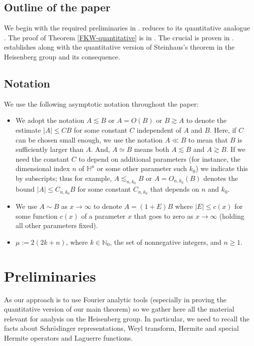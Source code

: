 \documentclass[11pt, reqno]{amsart}
\theoremstyle{plain}
\theoremstyle{remark}
\theoremstyle{example}
\theoremstyle{definition}
\numberwithin{equation}{section}
\newcommand{\N}{\mathbb N}
\def\Ha{\mathbb{H}^n}
\begin{document}
\subsection{Outline of the paper} We begin with the required preliminaries in .  reduces  to its quantitative analogue . The proof of Theorem \ref{FKW-quantitative} is in . The crucial  is proven in .  establishes  along with the quantitative version of Steinhaus's theorem in the Heisenberg group and its consequence.
\subsection{Notation}\label{notation-sec} We use the following asymptotic notation throughout the paper:
\begin{itemize}
    \item  We adopt the notation  $A\lesssim B$ or $A=O(B)$ or $ B \gtrsim A$ to denote the estimate $|A| \leq C B$ for some constant $C$ independent of $A$ and $B$. Here, if $C$ can be chosen small enough, we use the notation $A \ll B$ to mean that $B$ is sufficiently larger than $A$. And, $A \simeq B $ means both $A\lesssim B$ and $ A \gtrsim B$. If we need the constant $C$ to depend on additional parameters (for instance, the dimensional index $n$ of $\Ha$ or some other parameter such $k_{0}$)  we indicate this by subscripts; thus for example, $A \lesssim_{n,k_{0}} B$ or $A =O_{n,k_{0}}( B )$ denotes the bound $|A| \leq C_{n,k_{0}} B$ for some constant $C_{n,k_{0}}$ that depends on $n$ and $k_{0}$.
    \item We use $A \sim B$ as $x \rightarrow \infty$ to denote $A = (1 + E) B$ where $|E| \leq c(x)$ for some function $c(x)$ of a parameter $x$ that goes to zero as {$x \rightarrow \infty$} (holding all other parameters fixed).
    \item $\mu:= 2(2k+n)$, where $k \in \N_{0}$, the set of nonnegative integers, and $n \geq 1$.
\end{itemize}

\section{Preliminaries}\label{Preliminaries}
As our approach is to use Fourier analytic tools (especially in proving the quantitative version of our main theorem) so we gather here all the material relevant for analysis on the Heisenberg group. In particular, we need to recall the facts about Schr\"odinger representations, Weyl transform, Hermite and special Hermite operators and Laguerre functions.
\end{document}
